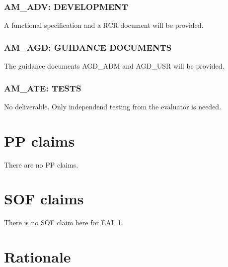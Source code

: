 \documentclass[12pt,english]{scrbook}
\begin{document}
\subsection{AM{\_}ADV: DEVELOPMENT}

A functional specification and a RCR document will be provided.





\subsection{AM{\_}AGD: GUIDANCE DOCUMENTS}

The guidance documents AGD{\_}ADM and AGD{\_}USR will be provided.





\subsection{AM{\_}ATE: TESTS}

No deliverable. Only independend testing from the evaluator is needed.





\chapter{PP claims}

There are no PP claims.





\chapter{SOF claims}

There is no SOF claim here for EAL 1.





\chapter{Rationale}
\end{document}
